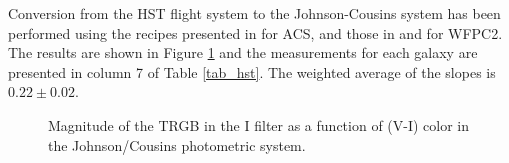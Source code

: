 \documentclass[11pt,preprint2]{aastex}
\newcommand{\slopeJC}{$0.22 \pm 0.02$}
\begin{document}
Conversion from the HST flight system to the Johnson-Cousins system has been performed using the recipes presented in \citet{2005PASP..117.1049S} for ACS, and those in \citet{2000PASP..112.1397D} and \citet{1995PASP..107.1065H} for WFPC2. The results are shown in Figure \ref{trgb_JC} and the measurements for each galaxy are presented in column 7 of Table \ref{tab_hst}.
The weighted average of the slopes is \slopeJC.





\begin{figure}
\caption{Magnitude of the TRGB in the I filter as a function of  (V-I) color in the Johnson/Cousins photometric system. \label{trgb_JC}}
\end{figure}



\end{document}
